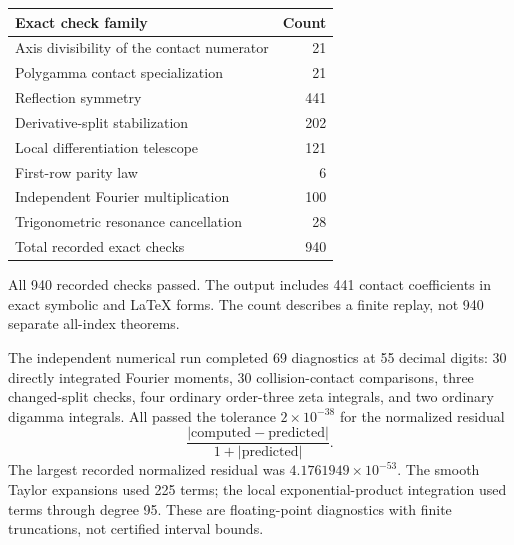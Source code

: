 
\begin{center}
\begin{tabular}{@{}lr@{}}
\toprule
Exact check family & Count\\
\midrule
Axis divisibility of the contact numerator & 21\\
Polygamma contact specialization & 21\\
Reflection symmetry & 441\\
Derivative-split stabilization & 202\\
Local differentiation telescope & 121\\
First-row parity law & 6\\
Independent Fourier multiplication & 100\\
Trigonometric resonance cancellation & 28\\
\midrule
Total recorded exact checks & 940\\
\bottomrule
\end{tabular}
\end{center}
All 940 recorded checks passed. The output includes 441 contact coefficients in exact symbolic and \LaTeX{} forms. The count describes a finite replay, not 940 separate all-index theorems.

The independent numerical run completed 69 diagnostics at 55 decimal digits: 30 directly integrated Fourier moments, 30 collision-contact comparisons, three changed-split checks, four ordinary order-three zeta integrals, and two ordinary digamma integrals. All passed the tolerance $2\times10^{-38}$ for the normalized residual
\[
 \frac{|\text{computed}-\text{predicted}|}{1+|\text{predicted}|}.
\]
The largest recorded normalized residual was $4.1761949\times10^{-53}$. The smooth Taylor expansions used 225 terms; the local exponential-product integration used terms through degree 95. These are floating-point diagnostics with finite truncations, not certified interval bounds.
